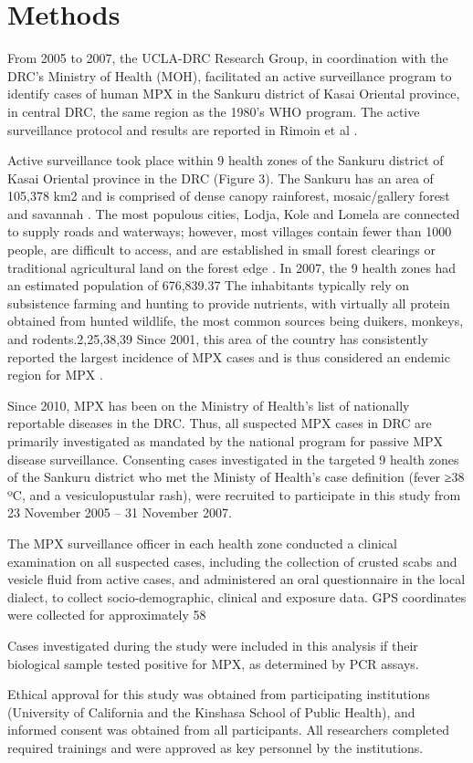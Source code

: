 \section{Methods}

From 2005 to 2007, the UCLA-DRC Research Group, in coordination with the DRC’s Ministry of Health (MOH), facilitated an active surveillance program to identify cases of human MPX in the Sankuru district of Kasai Oriental province, in central DRC, the same region as the 1980’s WHO program. The active surveillance protocol and results are reported in Rimoin et al \cite{Rimoin2010}.

Active surveillance took place within 9 health zones of the Sankuru district of Kasai Oriental province in the DRC (Figure 3). The Sankuru has an area of 105,378 km2 and is comprised of dense canopy rainforest, mosaic/gallery forest and savannah \cite{Fuller2011}. The most populous cities, Lodja, Kole and Lomela are connected to supply roads and waterways; however, most villages contain fewer than 1000 people, are difficult to access, and are established in small forest clearings or traditional agricultural land on the forest edge \cite{Rimoin2010}. In 2007, the 9 health zones had an estimated population of 676,839.37 The inhabitants typically rely on subsistence farming and hunting to provide nutrients, with virtually all protein obtained from hunted wildlife, the most common sources being duikers, monkeys, and rodents.2,25,38,39 Since 2001, this area of the country has consistently reported the largest incidence of MPX cases and is thus considered an endemic region for MPX \cite{Rimoin2010}. 

Since 2010, MPX has been on the Ministry of Health's list of nationally reportable diseases in the DRC. Thus, all suspected MPX cases in DRC are primarily investigated as mandated by the national program for passive MPX disease surveillance. Consenting cases investigated in the targeted 9 health zones of the Sankuru district who met the  Ministy of Health’s case definition (fever ≥38 ºC, and a vesiculopustular rash), were recruited to participate in this study from 23 November 2005 – 31 November 2007. 

The MPX surveillance officer in each health zone conducted a clinical examination on all suspected cases, including the collection of crusted scabs and vesicle fluid from active cases, and administered an oral questionnaire in the local dialect, to collect socio-demographic, clinical and exposure data. GPS coordinates were collected for approximately 58%

Cases investigated during the study were included in this analysis if their biological sample tested positive for MPX, as determined by PCR assays. 

Ethical approval for this study was obtained from participating institutions (University of California and the Kinshasa School of Public Health), and informed consent was obtained from all participants. All researchers completed required trainings and were approved as key personnel by the institutions. 




